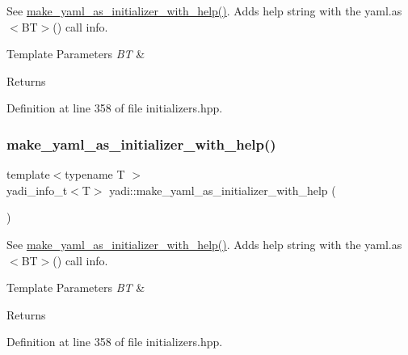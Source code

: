 See \hyperlink{namespaceyadi_a7bd6415252b551f9ffae445d25e30b7a}{make\+\_\+yaml\+\_\+as\+\_\+initializer\+\_\+with\+\_\+help()}. Adds help string with the yaml.\+as$<$\+B\+T$>$() call info. 


\begin{DoxyTemplParams}{Template Parameters}
{\em BT} & \\
\hline
\end{DoxyTemplParams}
\begin{DoxyReturn}{Returns}

\end{DoxyReturn}


Definition at line 358 of file initializers.\+hpp.

\mbox{\label{namespaceyadi_ac1095a9041ff52bd8df8ccd475fc18fc}} 
\subsubsection{\texorpdfstring{make\+\_\+yaml\+\_\+as\+\_\+initializer\+\_\+with\+\_\+help()}{make\_yaml\_as\_initializer\_with\_help()}\hspace{0.1cm}{\footnotesize\ttfamily [2/2]}}
{\footnotesize\ttfamily template$<$typename T $>$ \\
yadi\+\_\+info\+\_\+t$<$T$>$ yadi\+::make\+\_\+yaml\+\_\+as\+\_\+initializer\+\_\+with\+\_\+help (\begin{DoxyParamCaption}{ }\end{DoxyParamCaption})}



See \hyperlink{namespaceyadi_a7bd6415252b551f9ffae445d25e30b7a}{make\+\_\+yaml\+\_\+as\+\_\+initializer\+\_\+with\+\_\+help()}. Adds help string with the yaml.\+as$<$\+B\+T$>$() call info. 


\begin{DoxyTemplParams}{Template Parameters}
{\em BT} & \\
\hline
\end{DoxyTemplParams}
\begin{DoxyReturn}{Returns}

\end{DoxyReturn}


Definition at line 358 of file initializers.\+hpp.

